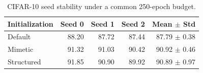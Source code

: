\begin{table}[H]
\centering
\small
\caption{CIFAR-10 seed stability under a common 250-epoch budget.}
\label{tab:seed-stability}
\begin{tabular}{lrrrr}
\toprule
Initialization & Seed 0 & Seed 1 & Seed 2 & Mean $\pm$ Std \\
\midrule
Default & 88.20 & 87.72 & 87.44 & 87.79 $\pm$ 0.38 \\
Mimetic & 91.32 & 91.03 & 90.42 & 90.92 $\pm$ 0.46 \\
Structured & 91.85 & 90.90 & 89.92 & 90.89 $\pm$ 0.97 \\
\bottomrule
\end{tabular}
\end{table}
